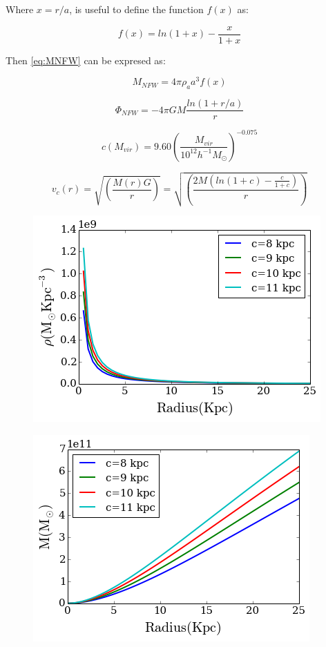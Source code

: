 Where $x = r/a$, is useful to define the function $f(x)$ as:

\begin{equation}
f(x) = ln(1 + x) - \frac{x}{1 + x} 
\end{equation}

Then \ref{eq:MNFW} can be expresed as:

\begin{equation}\label{eq:M2NFW}
M_{NFW} = 4 \pi \rho_a a^3 f(x)
\end{equation}

\begin{equation}\label{PhiNFW}
\Phi_{NFW} = -4\pi G M \frac{ln(1 + r/a)}{r}
\end{equation}

\begin{equation}\label{eq:cnfwz0}
c(M_{vir}) = 9.60  \left( \frac{M_{vir}}{10^{12}h^{-1}M_{\odot}} \right)^{-0.075}
\end{equation}



\begin{equation}\label{vcNFW}
v_c(r) = \sqrt{\left(\dfrac{M(r)G}{r}\right)} = \sqrt{\left( \dfrac{2 M  \left(  ln(1 + c) - \frac{c}{1 + c} \right)}{r} \right)}
\end{equation}


\begin{figure}[H]
\centering
\includegraphics[scale=0.7]{../figures/NFW_density.png}
\end{figure}

\begin{figure}[H]
\centering
\includegraphics[scale=0.7]{../figures/NFW_mass.png}
\end{figure}

